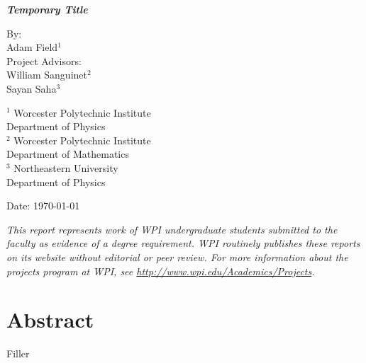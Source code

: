 \documentclass[12pt]{article}
\numberwithin{equation}{section}
\begin{document}
\hypersetup{pageanchor=false}
\begin{titlepage}
  \thispagestyle{empty}
  \begin{center}
    \vspace*{0.5in}

    {\Large\bfseries \emph{Temporary Title}}

    \vspace{0.75in}

    {\Large By:\\[0.5em]
    Adam Field${}^{1}$}\\[0.25em]
    \vspace{0.75in}
    {\Large Project Advisors:\\[0.5em]
    William Sanguinet${}^{2}$\\[0.25em]
    Sayan Saha${}^{3}$}
    \vspace{0.75in}

    ${}^{1}$ Worcester Polytechnic Institute\\[0.1em]
    Department of Physics\\[0.75em]
    ${}^{2}$ Worcester Polytechnic Institute\\[0.1em]
    Department of Mathematics\\[0.75em]
    ${}^{3}$ Northeastern University\\[0.1em]
    Department of Physics


    \vspace{0.75in}

    {\Large Date: \today}

    \vfill

    \begin{minipage}{0.85\textwidth}
      \centering\small\itshape
      This report represents work of WPI undergraduate students submitted to the faculty as evidence of a degree requirement. WPI routinely publishes these reports on its website without editorial or peer review. For more information about the projects program at WPI, see \href{http://www.wpi.edu/Academics/Projects}{http://www.wpi.edu/Academics/Projects}.
    \end{minipage}
  \end{center}
\end{titlepage}

\hypersetup{pageanchor=true}

\clearpage
\section*{Abstract}
{}
\doublespacing
\noindent
Filler
\singlespacing
\end{document}

